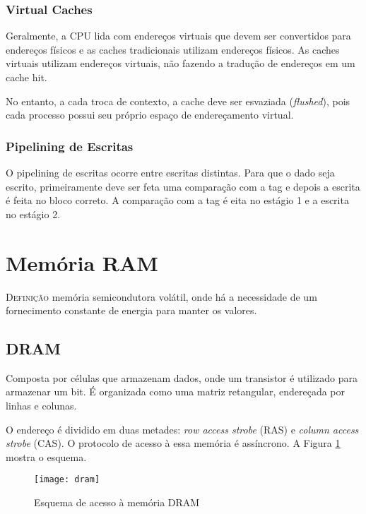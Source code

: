 \subsubsection{Virtual Caches}
Geralmente, a CPU lida com endereços virtuais que devem ser convertidos para endereços físicos e as caches tradicionais utilizam endereços físicos. As caches virtuais utilizam endereços virtuais, não fazendo a tradução de endereços em um cache hit.

No entanto, a cada troca de contexto, a cache deve ser esvaziada (\textit{flushed}), pois cada processo possui seu próprio espaço de endereçamento virtual.



\subsubsection{Pipelining de Escritas}
O pipelining de escritas ocorre entre escritas distintas. Para que o dado seja escrito, primeiramente deve ser feta uma comparação com a tag e depois a escrita é feita no bloco correto. A comparação com a tag é eita no estágio 1 e a escrita no estágio 2.








\section{Memória RAM}
\textsc{Definição} memória semicondutora volátil, onde há a necessidade de um fornecimento constante de energia para manter os valores.

\subsection{DRAM}
Composta por células que armazenam dados, onde um transistor é utilizado para armazenar um bit. É organizada como uma matriz retangular, endereçada por linhas e colunas.

O endereço é dividido em duas metades: \textit{row access strobe} (RAS) e \textit{column access strobe} (CAS). O protocolo de acesso à essa memória é assíncrono. A Figura \ref{fig:dram} mostra o esquema.

\begin{figure}[ht]
  \centering
  \texttt{[image: dram]}
  \caption{Esquema de acesso à memória DRAM}
  \label{fig:dram}
\end{figure}


